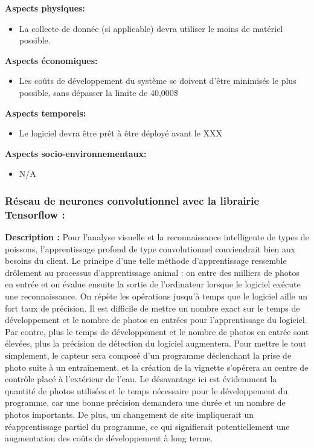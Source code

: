 \textbf{Aspects physiques:}
 \begin{itemize} [label = {--}]
    \item La collecte de donnée (si applicable) devra utiliser le moins de matériel possible.
\end{itemize}

 \textbf{Aspects économiques:}
 \begin{itemize} [label = {--}]
    \item Les coûts de développement du système se doivent d’être minimisés le plus possible, sans dépasser la limite de 40,000\$
\end{itemize}

 \textbf{Aspects temporels:}
 \begin{itemize} [label = {--}]
    \item Le logiciel devra être prêt à être déployé avant le XXX
\end{itemize}

 \textbf{Aspects socio-environnementaux:}
 \begin{itemize} [label = {--}]
    \item N/A
\end{itemize}

\subsubsection{Réseau de neurones convolutionnel avec la librairie Tensorflow :}

\textbf{Description :} Pour l’analyse visuelle et la reconnaissance intelligente de types de poissons, l’apprentissage profond de type convolutionnel conviendrait bien aux besoins du client. Le principe d’une telle méthode d’apprentissage ressemble drôlement au processus d’apprentissage animal : on entre des milliers de photos en entrée et on évalue ensuite la sortie de l’ordinateur lorsque le logiciel exécute une reconnaissance. On répète les opérations jusqu’à temps que le logiciel aille un fort taux de précision. Il est difficile de mettre un nombre exact sur le temps de développement et le nombre de photos en entrées pour l’apprentissage du logiciel. Par contre, plus le temps de développement et le nombre de photos en entrée sont élevées, plus la précision de détection du logiciel augmentera.  Pour mettre le tout simplement, le capteur sera composé d’un programme déclenchant la prise de photo suite à un entraînement, et la création de la vignette s’opérera au centre de contrôle placé à l’extérieur de l’eau. Le désavantage ici est évidemment la quantité de photos utilisées et le temps nécessaire pour le développement du programme, car une bonne précision demandera une durée et un nombre de photos importants. De plus, un changement de site impliquerait un réapprentissage partiel du programme, ce qui signifierait potentiellement une augmentation des coûts de développement à long terme.

